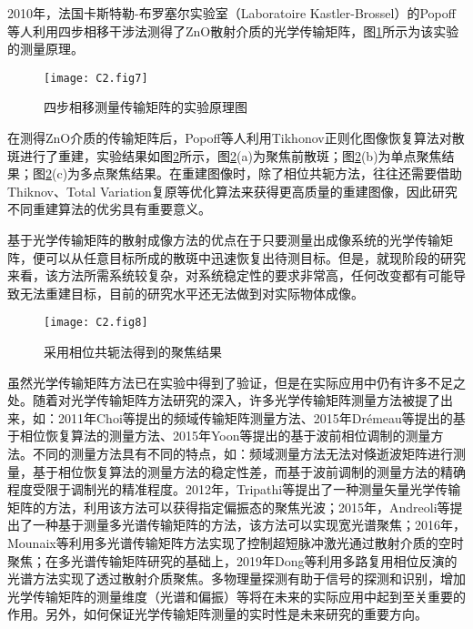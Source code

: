 2010年，法国卡斯特勒-布罗塞尔实验室（Laboratoire Kastler-Brossel）的Popoff等人\cite{Popoff2010}利用四步相移干涉法测得了ZnO散射介质的光学传输矩阵，图\ref{fig2:7}所示为该实验的测量原理。

\begin{figure}[htp]
	\centering
	\texttt{[image: C2.fig7]}
	\caption{四步相移测量传输矩阵的实验原理图\cite{Popoff2010}}
	\label{fig2:7}
\end{figure}

在测得ZnO介质的传输矩阵后，Popoff等人\cite{Popoff2010}利用Tikhonov正则化图像恢复算法对散斑进行了重建，实验结果如图\ref{fig2:8}所示，图\ref{fig2:8}(a)为聚焦前散斑；图\ref{fig2:8}(b)为单点聚焦结果；图\ref{fig2:8}(c)为多点聚焦结果。在重建图像时，除了相位共轭方法，往往还需要借助Thiknov、Total Variation复原等优化算法来获得更高质量的重建图像，因此研究不同重建算法的优劣具有重要意义\cite{popoff_controlling_2011}。

基于光学传输矩阵的散射成像方法的优点在于只要测量出成像系统的光学传输矩阵，便可以从任意目标所成的散斑中迅速恢复出待测目标。但是，就现阶段的研究来看，该方法所需系统较复杂，对系统稳定性的要求非常高，任何改变都有可能导致无法重建目标，目前的研究水平还无法做到对实际物体成像。

\begin{figure}[htp]
	\centering
	\texttt{[image: C2.fig8]}
	\caption{采用相位共轭法得到的聚焦结果\cite{Popoff2010}}
	\label{fig2:8}
\end{figure}

虽然光学传输矩阵方法已在实验中得到了验证，但是在实际应用中仍有许多不足之处。随着对光学传输矩阵方法研究的深入，许多光学传输矩阵测量方法被提了出来，如：2011年Choi等\cite{choi_overcoming_2011}提出的频域传输矩阵测量方法、2015年Drémeau等\cite{remeau_reference_less_2015}提出的基于相位恢复算法的测量方法、2015年Yoon等\cite{yoon_measuring_2015}提出的基于波前相位调制的测量方法。不同的测量方法具有不同的特点，如：频域测量方法无法对倏逝波矩阵进行测量，基于相位恢复算法的测量方法的稳定性差，而基于波前调制的测量方法的精确程度受限于调制光的精准程度。2012年，Tripathi等\cite{tripathi_vector_2012}提出了一种测量矢量光学传输矩阵的方法，利用该方法可以获得指定偏振态的聚焦光波；2015年，Andreoli等\cite{andreoli_deterministic_2015}提出了一种基于测量多光谱传输矩阵的方法，该方法可以实现宽光谱聚焦；2016年，Mounaix等\cite{mounaix_spatiotemporal_2016}利用多光谱传输矩阵方法实现了控制超短脉冲激光通过散射介质的空时聚焦；在多光谱传输矩阵研究的基础上，2019年Dong等\cite{dong_spectral_2019}利用多路复用相位反演的光谱方法实现了透过散射介质聚焦。多物理量探测有助于信号的探测和识别，增加光学传输矩阵的测量维度（光谱和偏振）等将在未来的实际应用中起到至关重要的作用。另外，如何保证光学传输矩阵测量的实时性是未来研究的重要方向。

